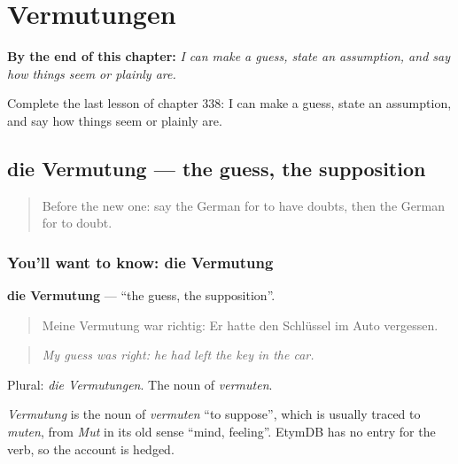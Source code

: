 
\chapter{Vermutungen}
\label{ch:ge-vermutungen}

\begin{chapteropening}
\textbf{By the end of this chapter:} \emph{I can make a guess, state an assumption, and say how things seem or plainly are.}

Complete the last lesson of chapter 338: I can make a guess, state an assumption, and say how things seem or plainly are.
\end{chapteropening}

\section[die Vermutung]{die Vermutung — the guess, the supposition}

\label{lesson:GE-C338-vermutung}



\begin{quote}
Before the new one: say the German for to have doubts, then the German for to doubt.
\end{quote}

\subsection*{You'll want to know: die Vermutung}
\textbf{die Vermutung} — \textquotedblleft{}the guess, the supposition\textquotedblright{}.

\begin{quote}
Meine Vermutung war richtig: Er hatte den Schlüssel im Auto vergessen.
\end{quote}

\begin{quote}
\emph{My guess was right: he had left the key in the car.}
\end{quote}

Plural: \emph{die Vermutungen}. The noun of \emph{vermuten}.

\begin{cousinweb}
\emph{Vermutung} is the noun of \emph{vermuten} \textquotedblleft{}to suppose\textquotedblright{}, which is usually traced to \emph{muten}, from \emph{Mut} in its old sense \textquotedblleft{}mind, feeling\textquotedblright{}. EtymDB has no entry for the verb, so the account is hedged.
\end{cousinweb}

